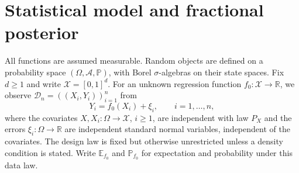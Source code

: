 \documentclass[11pt,a4paper]{article}
\theoremstyle{remark}
\newcommand{\Xcal}{\mathcal X}
\newcommand{\Dcal}{\mathcal D}
\newcommand{\PP}{\mathbb P}
\newcommand{\E}{\mathbb E}
\begin{document}

\section{Statistical model and fractional posterior}
\label{sec:setting}\label{sec:notation}

All functions are assumed measurable. Random objects are defined on
a probability space $(\Omega,\mathcal A,\PP)$, with Borel
$\sigma$-algebras on their state spaces. Fix
$d\geq1$ and write $\Xcal=[0,1]^d$. For an unknown regression
function $f_0:\Xcal\to\mathbb R$, we observe
$\Dcal_n=((X_i,Y_i))_{i=1}^n$ from
\begin{equation}\label{eq:model}
Y_i=f_0(X_i)+\xi_i,\qquad i=1,\ldots,n,
\end{equation}
where the covariates $X,X_i:\Omega\to\Xcal$, $i\geq1$, are
independent with law $P_X$ and the errors $\xi_i:\Omega\to\mathbb R$
are independent standard normal variables, independent of the covariates.
The design law is fixed but otherwise unrestricted unless a density
condition is stated. Write $\E_{f_0}$ and $\PP_{f_0}$ for expectation
and probability under this data law.
\end{document}
